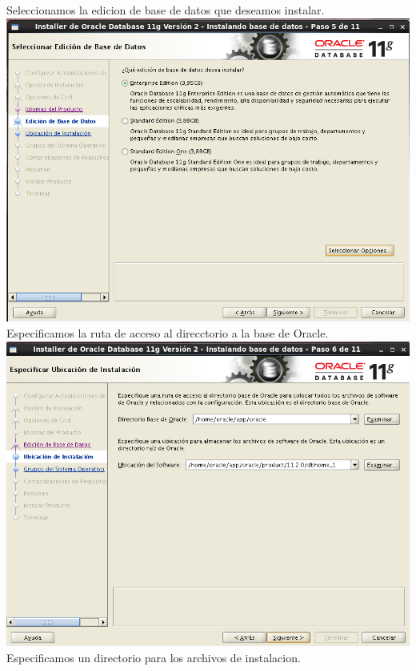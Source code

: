 \documentclass[12pt,letterpaper]{article}
\begin{document}
\begin{center}
Seleccionamos la edicion de base de datos que deseamos instalar.\\
\includegraphics[width=15cm]{./oraclelinux/16.png}\\
Especificamos la ruta de acceso al direcctorio a la base de Oracle.\\
\includegraphics[width=15cm]{./oraclelinux/17.png}\\
Especificamos un directorio para los archivos de instalacion.\\

\end{center}
\end{document}
